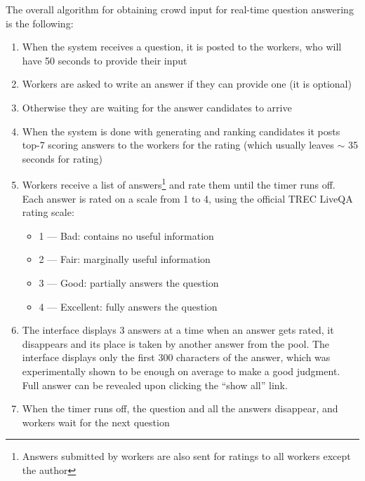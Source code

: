 The overall algorithm for obtaining crowd input for real-time question answering is the following:
\begin{enumerate}[noitemsep]
\item When the system receives a question, it is posted to the workers, who will have 50 seconds to provide their input
\item Workers are asked to write an answer if they can provide one (it is optional)
\item Otherwise they are waiting for the answer candidates to arrive
\item When the system is done with generating and ranking candidates it posts top-7 scoring answers to the workers for the rating (which usually leaves $\sim$ 35 seconds for rating)
\item Workers receive a list of answers\footnote{Answers submitted by workers are also sent for ratings to all workers except the author} and rate them until the timer runs off. Each answer is rated on a scale from 1 to 4, using the official TREC LiveQA rating scale:
    \begin{itemize}[noitemsep]
    \item 1 --- Bad: contains no useful information
    \item 2 --- Fair: marginally useful information
    \item 3 --- Good: partially answers the question
    \item 4 --- Excellent: fully answers the question
    \end{itemize}
\item The interface displays 3 answers at a time when an answer gets rated, it disappears and its place is taken by another answer from the pool. The interface displays only the first 300 characters of the answer, which was experimentally shown to be enough on average to make a good judgment.
Full answer can be revealed upon clicking the ``show all'' link.
\item When the timer runs off, the question and all the answers disappear, and workers wait for the next question
\end{enumerate}

